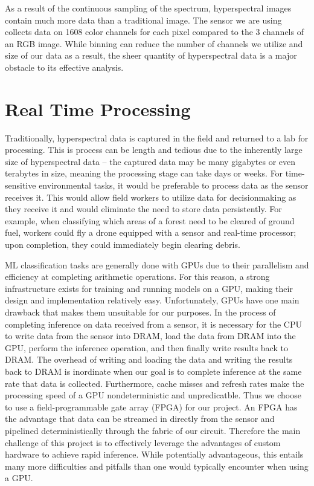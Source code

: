 \documentclass[psamsfonts]{amsart}
\newcommand{\mycomment}[1]{}
\theoremstyle{definition}
\theoremstyle{remark}
\numberwithin{equation}{section}
\begin{document}
As a result of the continuous sampling of the spectrum, hyperspectral images contain much more data than a traditional image. The sensor we are using collects data on 1608 color channels for each pixel compared to the 3 channels of an RGB image. While binning can reduce the number of channels we utilize and size of our data as a result, the sheer quantity of hyperspectral data is a major obstacle to its effective analysis.

\section{Real Time Processing}
Traditionally, hyperspectral data is captured in the field and returned to a lab for processing. This is process can be length and tedious due to the inherently large size of hyperspectral data -- the captured data may be many gigabytes or even terabytes in size, meaning the processing stage can take days or weeks.\mycomment{Note: is this true??} For time-sensitive environmental tasks, it would be preferable to process data as the sensor receives it. This would allow field workers to utilize data for decisionmaking as they receive it and would eliminate the need to store data persistently. For example, when classifying which areas of a forest need to be cleared of ground fuel, workers could fly a drone equipped with a sensor and real-time processor; upon completion, they could immediately begin clearing debris.

ML classification tasks are generally done with GPUs due to their parallelism and efficiency at completing arithmetic operations. For this reason, a strong infrastructure exists for training and running models on a GPU, making their design and implementation relatively easy. Unfortunately, GPUs have one main drawback that makes them unsuitable for our purposes. In the process of completing inference on data received from a sensor, it is necessary for the CPU to write data from the sensor into DRAM, load the data from DRAM into the GPU, perform the inference operation, and then finally write results back to DRAM. The overhead of writing and loading the data and writing the results back to DRAM is inordinate when our goal is to complete inference at the same rate that data is collected. Furthermore, cache misses and refresh rates make the processing speed of a GPU nondeterministic and unpredicatble. Thus we choose to use a field-programmable gate array (FPGA) for our project. An FPGA has the advantage that data can be streamed in directly from the sensor and pipelined deterministically through the fabric of our circuit. Therefore the main challenge of this project is to effectively leverage the advantages of custom hardware to achieve rapid inference. While potentially advantageous, this entails many more difficulties and pitfalls than one would typically encounter when using a GPU.
\end{document}
